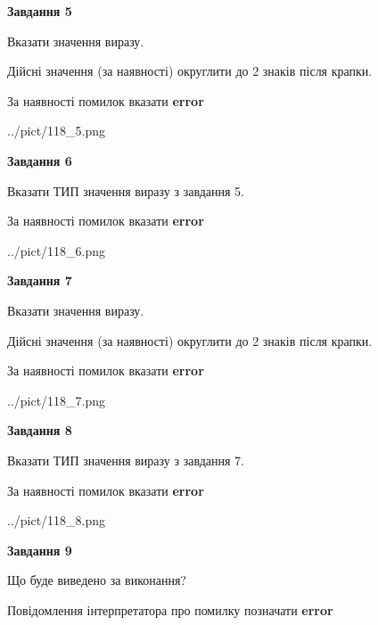 \documentclass[11pt, ukrainian]{article}
\begin{document}
{\begin {large}
{\begin {center}\textbf{Завдання 5}\end {center}}\par
Вказати значення виразу. \par
Дійсні значення (за наявності) округлити до 2 знаків після крапки. \par
За наявності помилок вказати \textbf{error}

\begin{center}
	{../pict/118_5.png}
\end{center}
\newpage

{\begin {center}\textbf{Завдання 6}\end {center}}\par
Вказати ТИП значення виразу з завдання 5. \par
За наявності помилок вказати \textbf{error}

\begin{center}
	{../pict/118_6.png}
\end{center}
\newpage

{\begin {center}\textbf{Завдання 7}\end {center}}\par
Вказати значення виразу. \par
Дійсні значення (за наявності) округлити до 2 знаків після крапки. \par
За наявності помилок вказати \textbf{error}

\begin{center}
	{../pict/118_7.png}
\end{center}
\newpage

{\begin {center}\textbf{Завдання 8}\end {center}}\par
Вказати ТИП значення виразу з завдання 7. \par
За наявності помилок вказати \textbf{error}

\begin{center}
	{../pict/118_8.png}
\end{center}
\newpage

{\begin {center}\textbf{Завдання 9}\end {center}}\par
Що буде виведено за виконання? \par
Повідомлення інтерпретатора про помилку позначати \textbf{error}


\end{large}}
\end{document}
